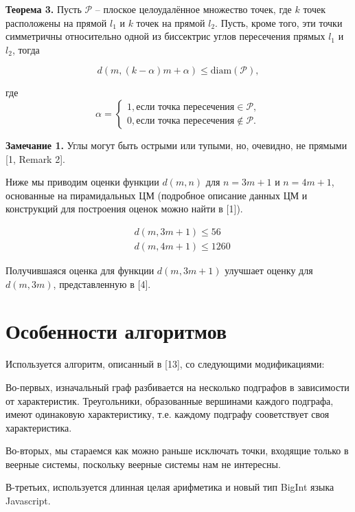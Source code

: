 \documentclass[12pt]{article}
\begin{document}
\par
\textbf{Теорема 3.}
Пусть $\mathcal{P}$ -- плоское целоудалённое множество точек, где
$k$ точек расположены на прямой $l_{1}$ и $k$ точек на прямой $l_{2}$.
Пусть, кроме того, эти точки симметричны относительно одной из биссектрис углов пересечения
прямых $l_{1}$ и $l_{2}$, тогда

\begin{equation}
d(m, (k - \alpha)m + \alpha) \leq \operatorname{diam(\mathcal{P})},
\end{equation}

где
\begin{equation*}
\alpha =
\begin{cases}
1, \text{если точка пересечения} \in \mathcal{P}, \\
0, \text{если точка пересечения} \notin \mathcal{P}.
\end{cases}
\end{equation*}

\par
\textbf{Замечание 1.}
Углы могут быть острыми или тупыми, но, очевидно, не прямыми [1, Remark 2].

Ниже мы приводим оценки функции $d(m, n)$ для $n = 3m + 1$ и $n = 4m + 1$, основанные на пирамидальных ЦМ (подробное описание данных ЦМ и конструкций для построения оценок можно найти в [1]).

\begin{align}
&d(m, 3m + 1) \leq 56 \\
&d(m, 4m + 1) \leq 1260
\end{align}

Получившаяся оценка для функции $d(m, 3m + 1)$ улучшает оценку для $d(m, 3m)$, представленную в [4].

\section{Особенности алгоритмов}
Используется алгоритм, описанный в [13], со следующими модификациями:

Во-первых, изначальный граф разбивается на несколько подграфов в зависимости от характеристик. Треугольники, образованные вершинами каждого подграфа, имеют одинаковую характеристику, т.е. каждому подграфу сооветствует своя
характеристика.

Во-вторых, мы стараемся как можно раньше исключать точки, входящие только в веерные системы, поскольку веерные системы
нам не интересны.

В-третьих, используется длинная целая арифметика и новый тип BigInt языка Javascript.
\end{document}
